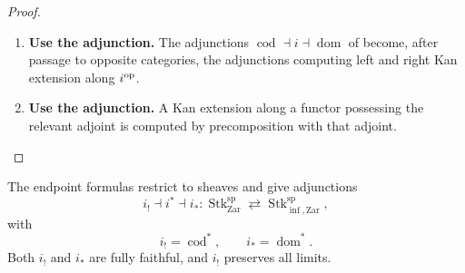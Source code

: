 \begin{proof}
\leavevmode
\begin{enumerate}[label=\textup{(\arabic*)}]
    \item \textbf{Use the adjunction.}
    The adjunctions \(\operatorname{cod}\dashv i\dashv\operatorname{dom}\) of  become, after
    passage to opposite categories, the adjunctions computing left and right Kan extension along
    \(i^{\mathrm{op}}\).

    \item \textbf{Use the adjunction.}
    A Kan extension along a functor possessing the relevant adjoint is computed by
    precomposition with that adjoint.
\end{enumerate}
\end{proof}

\begin{proposition}
\label{prop:first-three-infinitesimal-sheaf-adjoints}
The endpoint formulas restrict to sheaves and give adjunctions
\[
    i_!
    \dashv
    i^*
    \dashv
    i_*
    :
    \operatorname{Stk}^{\mathrm{sp}}_{\mathrm{Zar}}
    \rightleftarrows
    \operatorname{Stk}^{\mathrm{sp}}_{\inf,\mathrm{Zar}},
\]
with
\[
    i_!=\operatorname{cod}^*,
    \qquad
    i_*=\operatorname{dom}^*.
\]
Both \(i_!\) and \(i_*\) are fully faithful, and \(i_!\) preserves all
limits.
\end{proposition}

